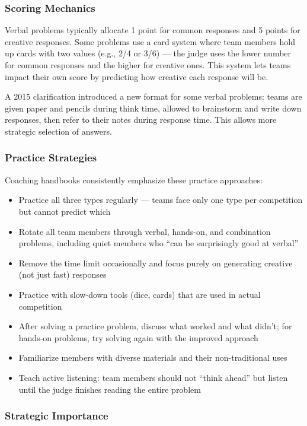 \documentclass[11pt,letterpaper]{article}
\begin{document}
\subsubsection{Scoring Mechanics}

Verbal problems typically allocate 1 point for common responses and 5 points for creative responses. Some problems use a card system where team members hold up cards with two values (e.g., 2/4 or 3/6) --- the judge uses the lower number for common responses and the higher for creative ones. This system lets teams impact their own score by predicting how creative each response will be.

A 2015 clarification introduced a new format for some verbal problems: teams are given paper and pencils during think time, allowed to brainstorm and write down responses, then refer to their notes during response time. This allows more strategic selection of answers.

\subsubsection{Practice Strategies}

Coaching handbooks consistently emphasize these practice approaches:

\begin{itemize}[leftmargin=2em]
\item Practice all three types regularly --- teams face only one type per competition but cannot predict which
\item Rotate all team members through verbal, hands-on, and combination problems, including quiet members who ``can be surprisingly good at verbal''
\item Remove the time limit occasionally and focus purely on generating creative (not just fast) responses
\item Practice with slow-down tools (dice, cards) that are used in actual competition
\item After solving a practice problem, discuss what worked and what didn't; for hands-on problems, try solving again with the improved approach
\item Familiarize members with diverse materials and their non-traditional uses
\item Teach active listening: team members should not ``think ahead'' but listen until the judge finishes reading the entire problem
\end{itemize}

\subsubsection{Strategic Importance}
\end{document}
